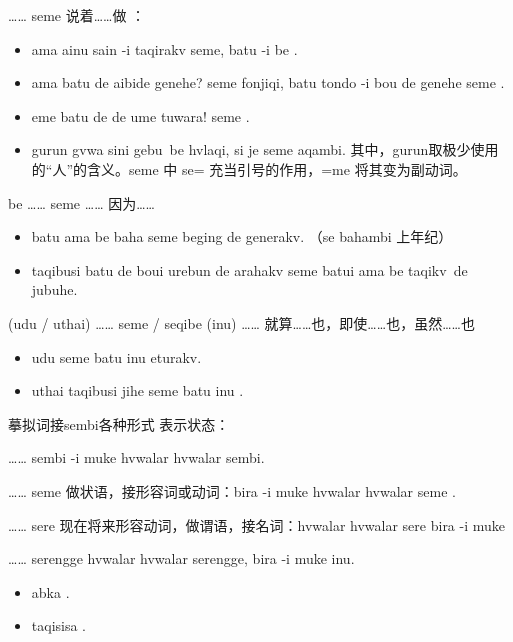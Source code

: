 \begin{des}
\begin{itemize}
        \end{itemize}
    \item[\A …… seme \V\ftn{主要}] \A 说着……做\V{} ：
        \begin{itemize}
            \item ama ainu sain -i taqirakv seme, batu -i  be .
            \item ama batu de aibide genehe? seme fonjiqi, batu tondo -i bou de  genehe seme .
            \item eme batu de  de ume tuwara! seme .
            \item gurun gvwa sini gebu~be hvlaqi, si je seme  aqambi. 其中，gurun取极少使用的“人”的含义。seme 中 se= 充当引号的作用，=me 将其变为副动词。
        \end{itemize}
    \item[\A be …… seme ……] 因为\A ……
        \begin{itemize}
            \item batu ama be  baha seme beging de generakv. （se bahambi 上年纪）
            \item taqibusi batu de boui urebun de arahakv seme batui ama be taqikv~de jubuhe.
        \end{itemize}
    \item[(udu / uthai) …… seme / seqibe (inu) ……] 就算……也，即使……也，虽然……也
        \begin{itemize}
            \item udu  seme batu inu   eturakv.
            \item uthai taqibusi jihe seme batu inu .
        \end{itemize}
    \item[摹拟词接sembi各种形式] 表示状态：
        \begin{des}
            \item[…… sembi]  -i muke hvwalar hvwalar sembi.
            \item[…… seme] 做状语，接形容词或动词：bira -i muke hvwalar hvwalar seme .
            \item[…… sere] 现在将来形容动词，做谓语，接名词：hvwalar hvwalar sere bira -i muke
            \item[…… serengge] hvwalar hvwalar serengge, bira -i muke inu.
        \end{des}
        \begin{itemize}
            \item abka  .
            \item {} taqisisa .
        \end{itemize}
\end{des}

